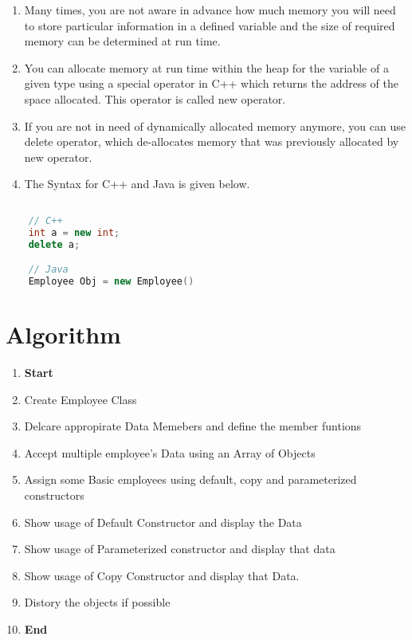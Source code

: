 \documentclass[11pt]{article}
\begin{document}
\begin{enumerate}
	\item Many times, you are not aware in advance how much memory you will need to store particular information in a defined variable and the size of required memory can be determined at run time.
	\item You can allocate memory at run time within the heap for the variable of a given type using a special operator in C++ which returns the address of the space allocated. This operator is called new operator.
	\item If you are not in need of dynamically allocated memory anymore, you can use delete operator, which de-allocates memory that was previously allocated by new operator.
	\item The Syntax for C++ and Java is given below. 
\end{enumerate}

\begin{lstlisting}[language = C++]
	
	// C++
	int a = new int;
	delete a;

	// Java
	Employee Obj = new Employee()

\end{lstlisting}

\section{Algorithm}

\begin{enumerate}
	\item \textbf{Start}
	\item Create Employee Class
	\item Delcare appropirate Data Memebers and define the member funtions
	\item Accept multiple employee's Data using an Array of Objects
	\item Assign some Basic employees using default, copy and parameterized constructors
	\item Show usage of Default Constructor and display the Data
	\item Show usage of Parameterized constructor and display that data
	\item Show usage of Copy Constructor and display that Data. 
	\item Distory the objects if possible
	\item \textbf{End}
\end{enumerate}
\end{document}

